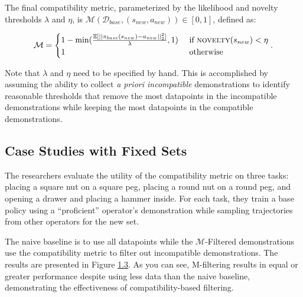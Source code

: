 \documentclass[
  letterpaper,
  DIV=11,
  numbers=noendperiod,
  oneside]{scrreprt}
\theoremstyle{remark}
\begin{document}
The final compatibility metric, parameterized by the likelihood and
novelty thresholds \(\lambda\) and \(\eta\), is
\(\mathcal{M}(\mathcal{D}_{base}, (s_{new}, a_{new})) \in [0, 1]\),
defined as:

\[\begin{aligned}
    \mathcal{M} = \begin{cases} 
        1 - \min(\frac{\mathbb{E}[|| \pi_{base}(s_{new}) - a_{new} ||^2_2]}{\lambda}, 1) & \text{ if } \textsc{novelty}(s_{new}) < \eta \\
        1 & \text{ otherwise }
       \end{cases}.
\end{aligned}\]

Note that \(\lambda\) and \(\eta\) need to be specified by hand. This is
accomplished by assuming the ability to collect \emph{a priori
incompatible} demonstrations to identify reasonable thresholds that
remove the most datapoints in the incompatible demonstrations while
keeping the most datapoints in the compatible demonstrations.

\subsection{Case Studies with Fixed
Sets}\label{case-studies-with-fixed-sets}

The researchers evaluate the utility of the compatibility metric on
three tasks: placing a square nut on a square peg, placing a round nut
on a round peg, and opening a drawer and placing a hammer inside. For
each task, they train a base policy using a ``proficient'' operator's
demonstration while sampling trajectories from other operators for the
new set.

The naive baseline is to use all datapoints while the
\(\mathcal{M}\)-Filtered demonstrations use the compatibility metric to
filter out incompatible demonstrations. The results are presented in
Figure \hyperref[fig:m_filter_table]{1.3}. As you can see, M-filtering
results in equal or greater performance despite using less data than the
naive baseline, demonstrating the effectiveness of compatibility-based
filtering.
\end{document}
